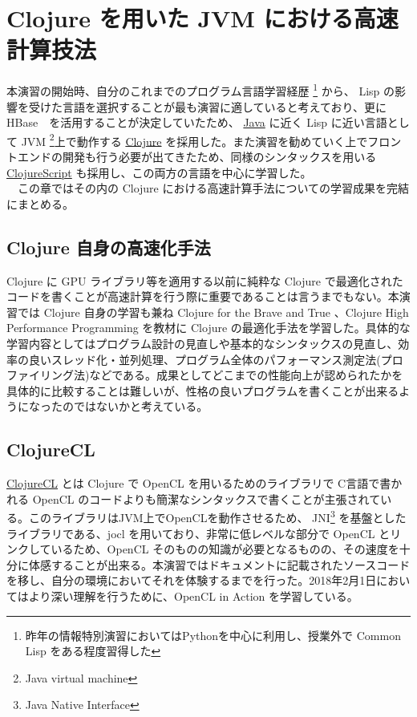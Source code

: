 \documentclass[dvipdfmx]{scrartcl}
\begin{document}
\newpage
\section{Clojure を用いた JVM における高速計算技法}
\label{sec:org142b1f0}
本演習の開始時、自分のこれまでのプログラム言語学習経歴 \footnote{昨年の情報特別演習においてはPythonを中心に利用し、授業外で Common Lisp をある程度習得した} から、 Lisp の影響を受けた言語を選択することが最も演習に適していると考えており、更に HBase　を活用することが決定していたため、 \href{https://www.java.com}{Java} に近く Lisp に近い言語として JVM \footnote{Java virtual machine}上で動作する \href{https://clojure.org}{Clojure} を採用した。また演習を勧めていく上でフロントエンドの開発も行う必要が出てきたため、同様のシンタックスを用いる \href{https://clojurescript.org}{ClojureScript} も採用し、この両方の言語を中心に学習した。\\
　この章ではその内の Clojure における高速計算手法についての学習成果を完結にまとめる。\\

\subsection{Clojure 自身の高速化手法}
\label{sec:orge0a480a}
Clojure に GPU ライブラリ等を適用する以前に純粋な Clojure で最適化されたコードを書くことが高速計算を行う際に重要であることは言うまでもない。本演習では Clojure 自身の学習も兼ね Clojure for the Brave and True \cite{Brave} 、Clojure High Performance Programming \cite{high-performance} を教材に Clojure の最適化手法を学習した。具体的な学習内容としてはプログラム設計の見直しや基本的なシンタックスの見直し、効率の良いスレッド化・並列処理、プログラム全体のパフォーマンス測定法(プロファイリング法)などである。成果としてどこまでの性能向上が認められたかを具体的に比較することは難しいが、性格の良いプログラムを書くことが出来るようになったのではないかと考えている。\\

\subsection{ClojureCL}
\label{sec:org835532e}
\href{http://clojurecl.uncomplicate.org/}{ClojureCL} とは Clojure で OpenCL を用いるためのライブラリで C言語で書かれる OpenCL のコードよりも簡潔なシンタックスで書くことが主張されている。このライブラリはJVM上でOpenCLを動作させるため、 JNI\footnote{Java Native Interface} を基盤としたライブラリである、jocl を用いており、非常に低レベルな部分で OpenCL とリンクしているため、OpenCL そのものの知識が必要となるものの、その速度を十分に体感することが出来る。本演習ではドキュメントに記載されたソースコードを移し、自分の環境においてそれを体験するまでを行った。2018年2月1日においてはより深い理解を行うために、OpenCL in Action \cite{OpenCL} を学習している。\\
\end{document}
